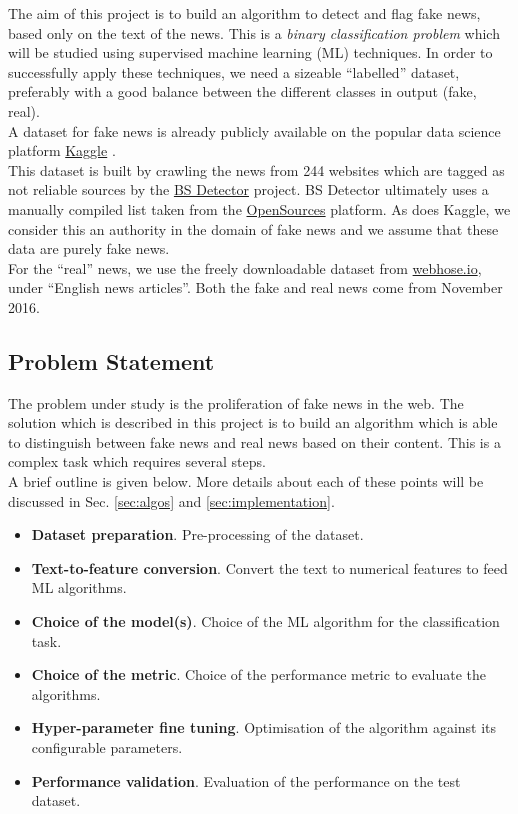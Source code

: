 \documentclass[a4paper,12pt]{article} %
\begin{document}
The aim of this project is to build an algorithm to detect and flag fake news,
based only on the text of the news. This is a \textit{binary classification problem} which will
be studied using supervised machine learning (ML) techniques.
In order to successfully apply these techniques, we
need a sizeable ``labelled'' dataset, preferably with a good balance
between the different classes in output (fake, real). \\
A dataset for fake news is already
publicly available on the popular data science platform
\href{https://www.kaggle.com}{Kaggle} \cite{KaggleDataset}. \\
This dataset is built by crawling the news from 244 websites which are
tagged as not reliable sources by the
\href{https://github.com/selfagency/bs-detector}{BS Detector} project.
BS Detector ultimately uses a manually compiled list taken
from the \href{http://www.opensources.co/}{OpenSources} platform.
As does Kaggle, we consider this an authority in the domain of fake
news and we assume that these data are purely fake news. \\
For the ``real'' news, we use the freely downloadable dataset from
\href{https://webhose.io/datasets}{webhose.io}, under ``English news
articles''.
Both the fake and real news come from November 2016.


\subsection{Problem Statement}
\label{sec:problem_statement}
The problem under study is the proliferation of fake news in the web.
The solution which is described in this project is to build
an algorithm which is able to distinguish between fake news
and real news based on their content.
This is a complex task which requires several steps. \\
A brief outline is given below.
More details about each of these points will be discussed in Sec. \ref{sec:algos} and \ref{sec:implementation}.
\begin{itemize}
\item \textbf{Dataset preparation}.
Pre-processing of the dataset.
\item \textbf{Text-to-feature conversion}.
Convert the text to numerical features to feed ML algorithms.
\item \textbf{Choice of the model(s)}.
Choice of the ML algorithm for the classification task.
\item \textbf{Choice of the metric}.
Choice of the performance metric to evaluate the algorithms.
\item \textbf{Hyper-parameter fine tuning}.
Optimisation of the algorithm against its configurable parameters.
\item \textbf{Performance validation}.
Evaluation of the performance on the test dataset.
\end{itemize}
\end{document}
